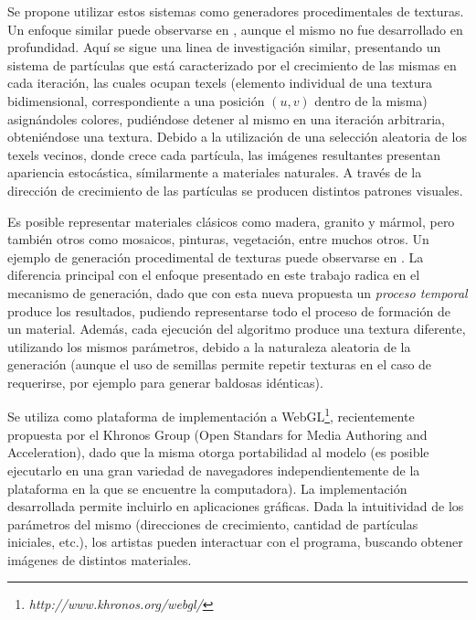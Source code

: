 Se propone utilizar estos sistemas como generadores procedimentales de texturas. Un enfoque similar puede observarse en \cite{Kranidotis98}, aunque el mismo no fue desarrollado en profundidad.
Aquí se sigue una linea de investigaci\'on similar, presentando un sistema de part\'iculas que est\'a caracterizado por el crecimiento de las mismas en cada iteraci\'on, las cuales ocupan texels (elemento individual de una textura bidimensional, correspondiente a una posición $(u,v)$ dentro de la misma) asign\'andoles colores, pudi\'endose detener al mismo en una iteración arbitraria, obteni\'endose una textura.
Debido a la utilización de una selección aleatoria de los texels vecinos, donde crece cada partícula, las im\'agenes resultantes presentan apariencia estocástica, símilarmente a materiales naturales.
A trav\'es de la direcci\'on de crecimiento de las part\'iculas se producen distintos patrones visuales.

Es posible representar materiales cl\'asicos como madera, granito y m\'armol, pero tambi\'en otros como mosaicos, pinturas, vegetaci\'on, entre muchos otros.
Un ejemplo de generación procedimental de texturas puede observarse en \cite{Baravalle2010}.
La diferencia principal con el enfoque presentado en este trabajo radica en el mecanismo de generaci\'on, dado que con esta nueva propuesta un {\em proceso temporal} produce los resultados, pudiendo representarse todo el proceso de formaci\'on de un material.
Adem\'as, cada ejecución del algoritmo produce una textura diferente, utilizando los mismos par\'ametros, debido a la naturaleza aleatoria de la generaci\'on (aunque el uso de semillas permite repetir texturas en el caso de requerirse, por ejemplo para generar baldosas id\'enticas).

Se utiliza como plataforma de implementaci\'on a WebGL\footnote{\em http://www.khronos.org/webgl/}, recientemente propuesta por el Khronos Group (Open Standars for Media Authoring and Acceleration), dado que la misma otorga portabilidad al modelo (es posible ejecutarlo en una gran variedad de navegadores independientemente de la plataforma en la que se encuentre la computadora). 
La implementación desarrollada permite incluirlo en aplicaciones gr\'aficas.
Dada la intuitividad de los parámetros del mismo (direcciones de crecimiento, cantidad de partículas iniciales, etc.), los artistas pueden interactuar con el programa, buscando obtener imágenes de distintos materiales.


